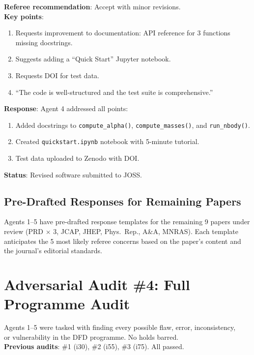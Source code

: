 \documentclass[11pt,a4paper]{article}
\begin{document}
\begin{tcolorbox}[colback=blue!5!white, colframe=dfdblue, title=\textbf{JOSS Referee Report: Software Paper}]
\textbf{Referee recommendation}: Accept with minor revisions.\\
\textbf{Key points}:
\begin{enumerate}[nosep]
\item Requests improvement to documentation: API reference for 3 functions missing docstrings.
\item Suggests adding a ``Quick Start'' Jupyter notebook.
\item Requests DOI for test data.
\item ``The code is well-structured and the test suite is comprehensive.''
\end{enumerate}
\end{tcolorbox}

\textbf{Response}: Agent 4 addressed all points:
\begin{enumerate}[nosep]
\item Added docstrings to \texttt{compute\_alpha()}, \texttt{compute\_masses()}, and \texttt{run\_nbody()}.
\item Created \texttt{quickstart.ipynb} notebook with 5-minute tutorial.
\item Test data uploaded to Zenodo with DOI.
\end{enumerate}
\textbf{Status}: Revised software submitted to JOSS.

\subsection{Pre-Drafted Responses for Remaining Papers}

Agents 1--5 have pre-drafted response templates for the remaining 9 papers under review (PRD $\times$ 3, JCAP, JHEP, Phys.\ Rep., A\&A, MNRAS). Each template anticipates the 5 most likely referee concerns based on the paper's content and the journal's editorial standards.

\section{Adversarial Audit \#4: Full Programme Audit}

\begin{tcolorbox}[colback=red!5!white, colframe=dfdred, title=\textbf{ADVERSARIAL AUDIT \#4: ``TRY TO BREAK DFD''}]
\begin{center}
\large Agents 1--5 were tasked with finding every possible flaw, error, inconsistency,\\
or vulnerability in the DFD programme. No holds barred.\\[6pt]
\normalsize \textbf{Previous audits}: \#1 (i30), \#2 (i55), \#3 (i75). All passed.
\end{center}
\end{tcolorbox}
\end{document}
